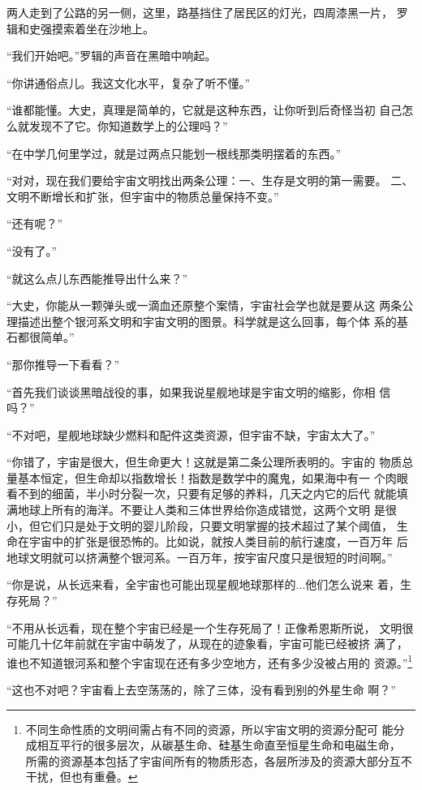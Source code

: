 两人走到了公路的另一侧，这里，路基挡住了居民区的灯光，四周漆黑一片，
罗辑和史强摸索着坐在沙地上。

“我们开始吧。”罗辑的声音在黑暗中响起。

“你讲通俗点儿。我这文化水平，复杂了听不懂。”

“谁都能懂。大史，真理是简单的，它就是这种东西，让你听到后奇怪当初
自己怎么就发现不了它。你知道数学上的公理吗？”

“在中学几何里学过，就是过两点只能划一根线那类明摆着的东西。”

“对对，现在我们要给宇宙文明找出两条公理：一、生存是文明的第一需要。
二、文明不断增长和扩张，但宇宙中的物质总量保持不变。”

“还有呢？”

“没有了。”

“就这么点儿东西能推导出什么来？”

“大史，你能从一颗弹头或一滴血还原整个案情，宇宙社会学也就是要从这
两条公理描述出整个银河系文明和宇宙文明的图景。科学就是这么回事，每个体
系的基石都很简单。”

“那你推导一下看看？”

“首先我们谈谈黑暗战役的事，如果我说星舰地球是宇宙文明的缩影，你相
信吗？”

“不对吧，星舰地球缺少燃料和配件这类资源，但宇宙不缺，宇宙太大了。”

“你错了，宇宙是很大，但生命更大！这就是第二条公理所表明的。宇宙的
物质总量基本恒定，但生命却以指数增长！指数是数学中的魔鬼，如果海中有一
个肉眼看不到的细菌，半小时分裂一次，只要有足够的养料，几天之内它的后代
就能填满地球上所有的海洋。不要让人类和三体世界给你造成错觉，这两个文明
是很小，但它们只是处于文明的婴儿阶段，只要文明掌握的技术超过了某个阈值，
生命在宇宙中的扩张是很恐怖的。比如说，就按人类目前的航行速度，一百万年
后地球文明就可以挤满整个银河系。一百万年，按宇宙尺度只是很短的时间啊。”

“你是说，从长远来看，全宇宙也可能出现星舰地球那样的...他们怎么说来
着，生存死局？”

“不用从长远看，现在整个宇宙已经是一个生存死局了！正像希恩斯所说，
文明很可能几十亿年前就在宇宙中萌发了，从现在的迹象看，宇宙可能已经被挤
满了，谁也不知道银河系和整个宇宙现在还有多少空地方，还有多少没被占用的
资源。”\footnote{不同生命性质的文明间需占有不同的资源，所以宇宙文明的资源分配可
能分成相互平行的很多层次，从碳基生命、硅基生命直至恒星生命和电磁生命，
所需的资源基本包括了宇宙间所有的物质形态，各层所涉及的资源大部分互不
干扰，但也有重叠。}

“这也不对吧？宇宙看上去空荡荡的，除了三体，没有看到别的外星生命
啊？”

